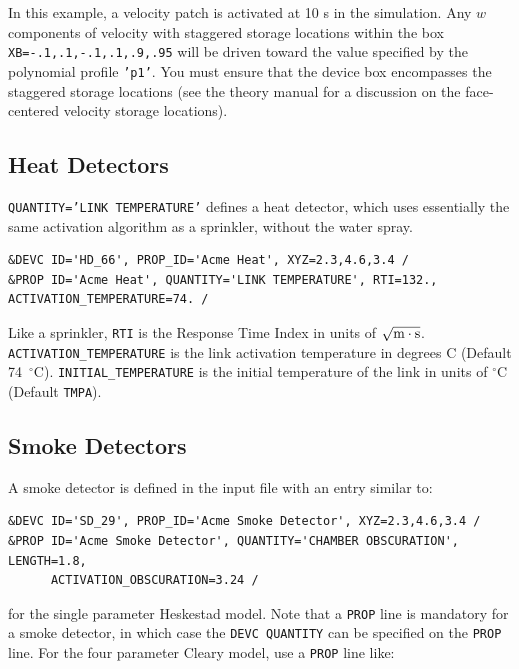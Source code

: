 \documentclass[11pt]{book}
\newcommand{\ct}{\tt\small}
\begin{document}
\normalsize
\noindent
In this example, a velocity patch is activated at 10 s in the simulation.  Any $w$ components of velocity with staggered storage locations within the box {\ct XB=-.1,.1,-.1,.1,.9,.95} will be driven toward the value specified by the polynomial profile {\ct 'p1'}.  You must ensure that the device box encompasses the staggered storage locations (see the theory manual \cite{FDS_Math_Guide} for a discussion on the face-centered velocity storage locations).

\subsection{Heat Detectors}
\label{info:heat_detectors}

{\ct QUANTITY='LINK TEMPERATURE'} defines a heat detector, which uses essentially the same activation algorithm as a sprinkler, without the water spray.

\footnotesize
\begin{verbatim}
&DEVC ID='HD_66', PROP_ID='Acme Heat', XYZ=2.3,4.6,3.4 /
&PROP ID='Acme Heat', QUANTITY='LINK TEMPERATURE', RTI=132., ACTIVATION_TEMPERATURE=74. /
\end{verbatim}

\normalsize
\noindent
Like a sprinkler, {\ct RTI} is the Response Time Index in units of
$\sqrt{\hbox{m}\cdot \hbox{s}}$.
{\ct ACTIVATION\_TEMPERATURE} is the link activation temperature in degrees C (Default 74~$^\circ$C).
{\ct INITIAL\_TEMPERATURE} is the initial temperature of the link in units of $^\circ$C (Default {\ct TMPA}).



\subsection{Smoke Detectors}
\label{info:smoke_detector}

A smoke detector is defined in the input file with an entry similar to:

\footnotesize
\begin{verbatim}
&DEVC ID='SD_29', PROP_ID='Acme Smoke Detector', XYZ=2.3,4.6,3.4 /
&PROP ID='Acme Smoke Detector', QUANTITY='CHAMBER OBSCURATION', LENGTH=1.8,
      ACTIVATION_OBSCURATION=3.24 /
\end{verbatim}

\normalsize
\noindent
for the single parameter Heskestad model. Note that a {\ct PROP} line is mandatory for a smoke detector, in which case the
{\ct DEVC QUANTITY} can be specified on the {\ct PROP} line. For the four parameter Cleary model, use a {\ct PROP} line like:
\end{document}
